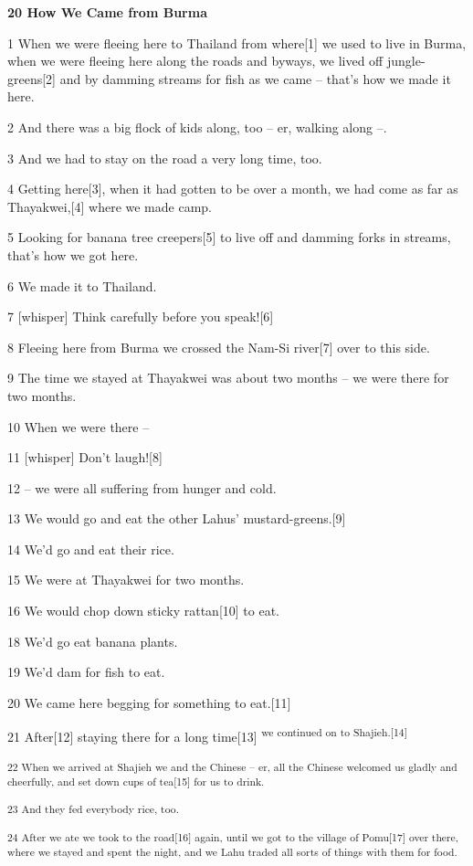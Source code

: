 
\textbf{20 How We Came from Burma}

1 When we were fleeing here to Thailand from where[1] we used to live in Burma,
when we were fleeing here along the roads and byways, we lived off jungle-greens[2]
and by damming streams for fish as we came -- that's how we made it here.

2 And there was a big flock of kids along, too -- er, walking along --.

3 And we had to stay on the road a very long time, too.

4 Getting here[3], when it had gotten to be over a month, we had come as far as
Thayakwei,[4] where we made camp.

5 Looking for banana tree creepers[5] to live off and damming forks in streams,
that's how we got here.

6 We made it to Thailand.

7 [whisper] Think carefully before you speak![6]

8 Fleeing here from Burma we crossed the Nam-Si river[7] over to this side.

9 The time we stayed at Thayakwei was about two months -- we were there for two
months.

10 When we were there --

11 [whisper] Don't laugh![8]

12 -- we were all suffering from hunger and cold.

13 We would go and eat the other Lahus' mustard-greens.[9]

14 We'd go and eat their rice.

15 We were at Thayakwei for two months.

16 We would chop down sticky rattan[10] to eat.

18 We'd go eat banana plants.

19 We'd dam for fish to eat.

20 We came here begging for something to eat.[11]

21 After[12] staying there for a long time[13]\textsuperscript{ we continued on
to Shajieh.[14] }

\textsuperscript{22 When we arrived at Shajieh we and the Chinese -- er, all the
Chinese welcomed us gladly and cheerfully, and set down cups of tea[15] for us
to drink. }

\textsuperscript{23 And they fed everybody rice, too. }

\textsuperscript{24 After we ate we took to the road[16] again, until we got to
the village of Pomu[17] over there, where we stayed and spent the night, and we
Lahu traded all sorts of things with them for food.}

